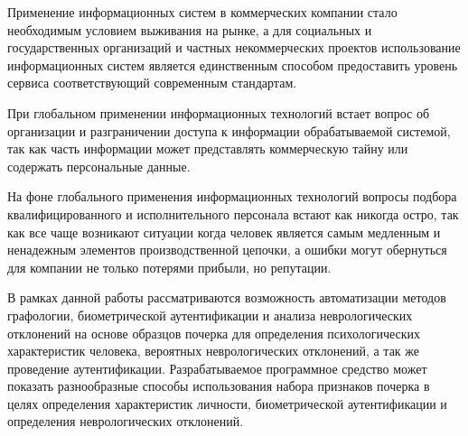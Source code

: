 \label{sec:intro}

Применение информационных систем в коммерческих компании стало необходимым условием выживания на рынке, а для социальных и государственных организаций и частных некоммерческих проектов использование информационных систем является единственным способом предоставить уровень сервиса соответствующий современным стандартам. 

При глобальном применении информационных технологий встает вопрос об организации и разграничении доступа к информации обрабатываемой системой, так как часть информации может представлять коммерческую тайну или содержать персональные данные.

На фоне глобального применения информационных технологий вопросы подбора квалифицированного и исполнительного персонала встают как никогда остро, так как все чаще возникают ситуации когда человек является самым медленным и ненадежным элементов производственной цепочки, а ошибки могут обернуться для компании не только потерями прибыли, но репутации.

В рамках данной работы рассматриваются возможность автоматизации методов графологии, биометрической аутентификации и анализа неврологических отклонений на основе образцов почерка для определения психологических характеристик человека, вероятных неврологических отклонений, а так же проведение аутентификации.
Разрабатываемое программное средство может показать разнообразные способы использования набора признаков почерка в целях определения характеристик личности, биометрической аутентификации и определения неврологических отклонений.